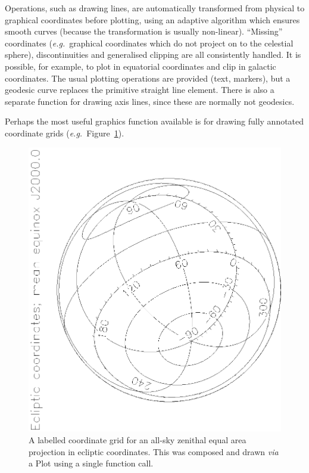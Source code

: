 \documentclass[twoside,11pt]{article}
\newenvironment{latexonly}{}{}
\begin{document}
Operations, such as drawing lines, are automatically transformed from
physical to graphical coordinates before plotting, using an adaptive
algorithm which ensures smooth curves (because the transformation is
usually non-linear).  ``Missing'' coordinates ({\em{e.g.}}\ graphical
coordinates which do not project on to the celestial sphere),
discontinuities and generalised clipping are all consistently handled.
It is possible, for example, to plot in equatorial coordinates and
clip in galactic coordinates.  The usual plotting operations are
provided (text, markers), but a geodesic curve replaces the primitive
straight line element.  There is also a separate function for drawing
axis lines, since these are normally not geodesics.

\begin{latexonly}
   Perhaps the most useful graphics function available is for drawing
   fully annotated coordinate grids ({\em{e.g.}}\ Figure~\ref{fig:gridplot}).
   \begin{figure}
   \begin{center}
   \includegraphics[scale=0.8,angle=-90]{sun211_figures/gridplot_bw.eps}
   \caption{A labelled coordinate grid for an all-sky zenithal equal area
   projection in ecliptic coordinates. This was composed and drawn
   {\em{via}} a Plot using a
   single function call.}
   \label{fig:gridplot}
   \end{center}
   \end{figure}
\end{latexonly}
\end{document}
